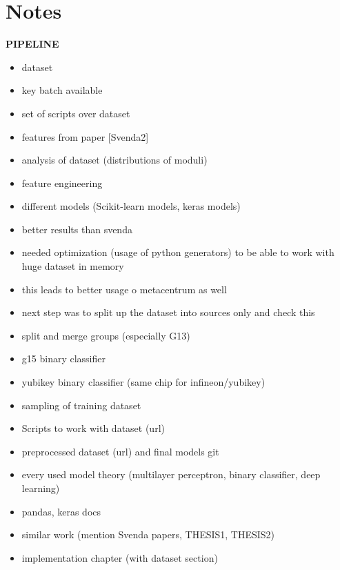 \chapter{Notes}

\textbf{PIPELINE}
\begin{itemize}

\item dataset
\item key batch available
\item set of scripts over dataset
\item features from paper [Svenda2]
\item analysis of dataset (distributions of moduli)
\item feature engineering
\item different models (Scikit-learn models, keras models)
\item better results than svenda
\item needed optimization (usage of python generators) to be able to work with huge dataset in memory
\item this leads to better usage o metacentrum as well
\item next step was to split up the dataset into sources only and check this
\item split and merge groups (especially G13)
\item g15 binary classifier
\item yubikey binary classifier (same chip for infineon/yubikey)
\item sampling of training dataset 
\item Scripts to work with dataset (url)
\item preprocessed dataset (url) and final models git
\item every used model theory (multilayer perceptron, binary classifier, deep learning)
\item pandas, keras docs
\item similar work (mention Svenda papers, THESIS1, THESIS2)

\item implementation chapter (with dataset section)


\end{itemize}